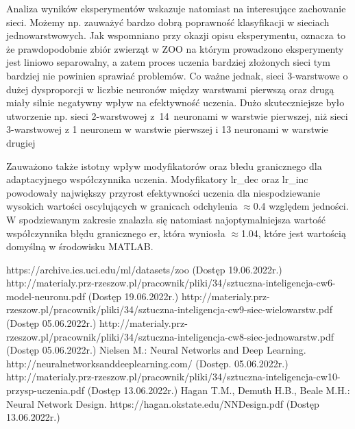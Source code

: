 \documentclass[12pt,twoside]{article}
\begin{document}
Analiza wyników eksperymentów wskazuje natomiast na interesujące zachowanie sieci.
Możemy np. zauważyć bardzo dobrą poprawność klasyfikacji w sieciach jednowarstwowych.
Jak wspomniano przy okazji opisu eksperymentu, oznacza to że prawdopodobnie zbiór zwierząt w ZOO na którym prowadzono eksperymenty jest liniowo separowalny, a zatem proces uczenia bardziej złożonych sieci tym bardziej nie powinien sprawiać problemów.
Co ważne jednak, sieci 3-warstwowe o dużej dysproporcji w liczbie neuronów między warstwami pierwszą oraz drugą miały silnie negatywny wpływ na efektywność uczenia.
Dużo skuteczniejsze było utworzenie np. sieci 2-warstwowej z~14~neuronami w warstwie pierwszej, niż sieci 3-warstwowej z 1 neuronem w warstwie pierwszej i 13 neuronami w warstwie drugiej

Zauważono także istotny wpływ modyfikatorów oraz błedu granicznego dla adaptacyjnego współczynnika uczenia.
Modyfikatory lr\_dec oraz lr\_inc powodowały największy przyrost efektywności uczenia dla niespodziewanie wysokich wartości oscylujących w granicach odchylenia $\approx$0.4 względem jedności.
W spodziewanym zakresie znalazła się natomiast najoptymalniejsza wartość współczynnika błędu granicznego er, która wyniosła $\approx$1.04, które jest wartością domyślną w środowisku MATLAB.



\clearpage


\begin{thebibliography}{4}
	 https://archive.ics.uci.edu/ml/datasets/zoo (Dostęp 19.06.2022r.)
	 http://materialy.prz-rzeszow.pl/pracownik/pliki/34/sztuczna-inteligencja-cw6-model-neuronu.pdf (Dostęp 19.06.2022r.)
	 http://materialy.prz-rzeszow.pl/pracownik/pliki/34/sztuczna-inteligencja-cw9-siec-wielowarstw.pdf (Dostęp 05.06.2022r.)
	 http://materialy.prz-rzeszow.pl/pracownik/pliki/34/sztuczna-inteligencja-cw8-siec-jednowarstw.pdf (Dostęp 05.06.2022r.)
	 Nielsen M.: Neural Networks and Deep Learning. http://neuralnetworksanddeeplearning.com/ (Dostęp. 05.06.2022r.)
	 http://materialy.prz-rzeszow.pl/pracownik/pliki/34/sztuczna-inteligencja-cw10-przysp-uczenia.pdf (Dostęp 13.06.2022r.)
	 Hagan T.M., Demuth H.B., Beale M.H.: Neural Network Design. https://hagan.okstate.edu/NNDesign.pdf (Dostęp 13.06.2022r.)
\end{thebibliography}

\clearpage
\listoffigures
\clearpage
\lstlistoflistings
\end{document}
